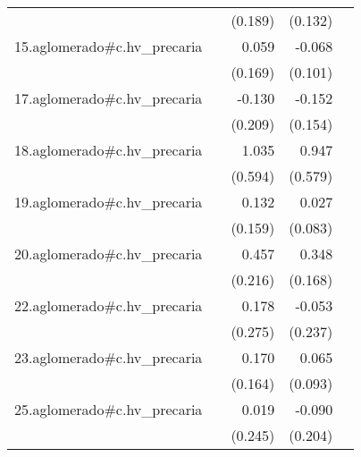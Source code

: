 {\begin{longtable}{l*{4}{D{.}{.}{-1}}}
            &                     &     (0.189)         &     (0.132)         &                     \\
\addlinespace
15.aglomerado#c.hv\_precaria&                     &       0.059         &      -0.068         &                     \\
            &                     &     (0.169)         &     (0.101)         &                     \\
\addlinespace
17.aglomerado#c.hv\_precaria&                     &      -0.130         &      -0.152         &                     \\
            &                     &     (0.209)         &     (0.154)         &                     \\
\addlinespace
18.aglomerado#c.hv\_precaria&                     &       1.035         &       0.947         &                     \\
            &                     &     (0.594)         &     (0.579)         &                     \\
\addlinespace
19.aglomerado#c.hv\_precaria&                     &       0.132         &       0.027         &                     \\
            &                     &     (0.159)         &     (0.083)         &                     \\
\addlinespace
20.aglomerado#c.hv\_precaria&                     &       0.457\sym{*}  &       0.348\sym{*}  &                     \\
            &                     &     (0.216)         &     (0.168)         &                     \\
\addlinespace
22.aglomerado#c.hv\_precaria&                     &       0.178         &      -0.053         &                     \\
            &                     &     (0.275)         &     (0.237)         &                     \\
\addlinespace
23.aglomerado#c.hv\_precaria&                     &       0.170         &       0.065         &                     \\
            &                     &     (0.164)         &     (0.093)         &                     \\
\addlinespace
25.aglomerado#c.hv\_precaria&                     &       0.019         &      -0.090         &                     \\
            &                     &     (0.245)         &     (0.204)         &                     \\

\end{longtable}}
